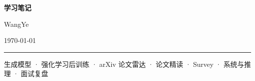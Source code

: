 \documentclass[12pt, a4paper]{article}
\begin{document}
\begin{titlepage}
  \centering
  \vspace*{3cm}
  {\Huge\bfseries\color{primary} 学习笔记}\par
  \vspace{0.5cm}
  {\large\color{textgray} WangYe}\par
  \vspace{0.3cm}
  {\normalsize\color{textgray} \today}\par
  \vspace{2cm}
  \textcolor{codeborder}{\rule{0.6\linewidth}{0.8pt}}\par
  \vspace{1cm}
  {\normalsize\color{textgray}
    生成模型 · 强化学习后训练 · arXiv 论文雷达 · 论文精读 · Survey · 系统与推理 · 面试复盘
  }\par
  \vfill
\end{titlepage}

\tableofcontents
\newpage


\end{document}
